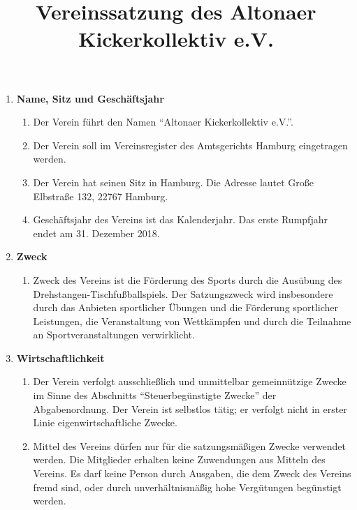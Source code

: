 \documentclass{article}
\title{\textsf{\textbf{Vereinssatzung des Altonaer Kickerkollektiv e.V.}}}
\author{}
\date{}
\begin{document}
\maketitle

\begin{enumerate}[§ 1.]
\item \textsf{\textbf{Name, Sitz und Geschäftsjahr}}
\begin{enumerate}
\item Der Verein führt den Namen "`Altonaer Kickerkollektiv e.V."'.
\item Der Verein soll im Vereinsregister des Amtsgerichts Hamburg eingetragen werden.
\item Der Verein hat seinen Sitz in Hamburg. Die Adresse lautet Große Elbstraße 132, 22767 Hamburg.
\item Geschäftsjahr des Vereins ist das Kalenderjahr. Das erste Rumpfjahr endet am 31. Dezember 2018.
\end{enumerate}

\item \textsf{\textbf{Zweck}}
\begin{enumerate}
\item[] Zweck des Vereins ist die Förderung des Sports durch die Ausübung des Drehstangen-Tischfußballspiels. Der Satzungszweck wird insbesondere durch das Anbieten sportlicher Übungen und die Förderung sportlicher Leistungen, die Veranstaltung von Wettkämpfen und durch die Teilnahme an Sportveranstaltungen verwirklicht.
\end{enumerate}

\item \textsf{\textbf{Wirtschaftlichkeit}}
\begin{enumerate}
\item Der Verein verfolgt ausschließlich und unmittelbar gemeinnützige Zwecke im Sinne des Abschnitts "`Steuerbegünstigte Zwecke"' der Abgabenordnung. Der Verein ist selbstlos tätig; er verfolgt nicht in erster Linie eigenwirtschaftliche Zwecke.
\item Mittel des Vereins dürfen nur für die satzungsmäßigen Zwecke verwendet werden. Die Mitglieder erhalten keine Zuwendungen aus Mitteln des Vereins. Es darf keine Person durch Ausgaben, die dem Zweck des Vereins fremd sind, oder durch unverhältnismäßig hohe Vergütungen begünstigt werden.
\end{enumerate}


\end{enumerate}
\end{document}
